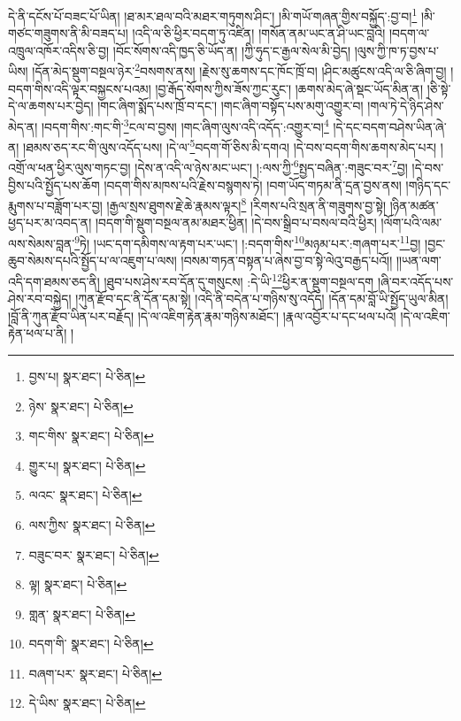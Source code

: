 དེ་ནི་དངོས་པོ་བཟང་པོ་ཡིན། །ཐ་མར་ཐལ་བའི་མཐར་གཏུགས་ཤིང་། །མི་གཡོ་གཞན་གྱིས་བསྐྱོད་:བྱ་བ།\footnote{བྱས་པ།  སྣར་ཐང་།  པེ་ཅིན། } །མི་གཙང་གཟུགས་ནི་མི་བཟད་པ། །འདི་ལ་ཅི་ཕྱིར་བདག་ཏུ་འཛིན། །གསོན་ནམ་ཡང་ན་ཤི་ཡང་བླའི། །བདག་ལ་འཁྲུལ་འཁོར་འདིས་ཅི་བྱ། །བོང་སོགས་འདི་ཁྱད་ཅི་ཡོད་ན། །ཀྱི་ཧུད་ང་རྒྱལ་སེལ་མི་བྱེད། །ལུས་ཀྱི་ཁ་ཏ་བྱས་པ་ཡིས། །དོན་མེད་སྡུག་བསྔལ་ཉེར་\footnote{ཉེས་  སྣར་ཐང་།  པེ་ཅིན། }བསགས་ནས། །རྗེས་སུ་ཆགས་དང་ཁོང་ཁྲོ་བ། །ཤིང་མཚུངས་འདི་ལ་ཅི་ཞིག་བྱ། །བདག་གིས་འདི་ལྟར་བསྐྱངས་པའམ། །བྱ་རྒོད་སོགས་ཀྱིས་ཟོས་ཀྱང་རུང་། །ཆགས་མེད་ཞེ་སྡང་ཡོད་མིན་ན། །ཅི་སྟེ་དེ་ལ་ཆགས་པར་བྱེད། །གང་ཞིག་སྨོད་པས་ཁྲོ་བ་དང་། །གང་ཞིག་བསྟོད་པས་མགུ་འགྱུར་བ། །གལ་ཏེ་དེ་ཉིད་ཤེས་མེད་ན། །བདག་གིས་:གང་གི་\footnote{གང་གིས་  སྣར་ཐང་།  པེ་ཅིན། }ངལ་བ་བྱས། །གང་ཞིག་ལུས་འདི་འདོད་:འགྱུར་བ།\footnote{གྱུར་པ།  སྣར་ཐང་།  པེ་ཅིན། } །དེ་དང་བདག་བཤེས་ཡིན་ཞེ་ན། །ཐམས་ཅད་རང་གི་ལུས་འདོད་པས། །དེ་ལ་\footnote{ལའང་  སྣར་ཐང་།  པེ་ཅིན། }བདག་གོ་ཅིས་མི་དགའ། །དེ་བས་བདག་གིས་ཆགས་མེད་པར། །འགྲོ་ལ་ཕན་ཕྱིར་ལུས་གཏང་བྱ། །དེས་ན་འདི་ལ་ཉེས་མང་ཡང་། །:ལས་ཀྱི་\footnote{ལས་ཀྱིས་  སྣར་ཐང་།  པེ་ཅིན། }སྤྱད་བཞིན་:གཟུང་བར་\footnote{བཟུང་བར་  སྣར་ཐང་།  པེ་ཅིན། }བྱ། །དེ་བས་བྱིས་པའི་སྤྱོད་པས་ཆོག །བདག་གིས་མཁས་པའི་རྗེས་བསྙགས་ཏེ། །བག་ཡོད་གཏམ་ནི་དྲན་བྱས་ནས། །གཉིད་དང་རྨུགས་པ་བཟློག་པར་བྱ། །རྒྱལ་སྲས་ཐུགས་རྗེ་ཆེ་རྣམས་ལྟར།\footnote{ལྟ།  སྣར་ཐང་།  པེ་ཅིན། } །རིགས་པའི་སྲན་ནི་གཟུགས་བྱ་སྟེ། །ཉིན་མཚན་ཕྱད་པར་མ་འབད་ན། །བདག་གི་སྡུག་བསྔལ་ནམ་མཐར་ཕྱིན། །དེ་བས་སྒྲིབ་པ་བསལ་བའི་ཕྱིར། །ལོག་པའི་ལམ་ལས་སེམས་བླན་\footnote{གླན་  སྣར་ཐང་།  པེ་ཅིན། }ཏེ། །ཡང་དག་དམིགས་ལ་རྟག་པར་ཡང་། །:བདག་གིས་\footnote{བདག་གི་  སྣར་ཐང་།  པེ་ཅིན། }མཉམ་པར་:གཞག་པར་\footnote{བཞག་པར་  སྣར་ཐང་།  པེ་ཅིན། }བྱ། །བྱང་ཆུབ་སེམས་དཔའི་སྤྱོད་པ་ལ་འཇུག་པ་ལས། །བསམ་གཏན་བསྟན་པ་ཞེས་བྱ་བ་སྟེ་ལེའུ་བརྒྱད་པའོ།། །།ཡན་ལག་འདི་དག་ཐམས་ཅད་ནི། །ཐུབ་པས་ཤེས་རབ་དོན་དུ་གསུངས། :དེ་ཡི་\footnote{དེ་ཡིས་  སྣར་ཐང་།  པེ་ཅིན། }ཕྱིར་ན་སྡུག་བསྔལ་དག །ཞི་བར་འདོད་པས་ཤེས་རབ་བསྐྱེད། །ཀུན་རྫོབ་དང་ནི་དོན་དམ་སྟེ། །འདི་ནི་བདེན་པ་གཉིས་སུ་འདོད། །དོན་དམ་བློ་ཡི་སྤྱོད་ཡུལ་མིན། །བློ་ནི་ཀུན་རྫོབ་ཡིན་པར་བརྗོད། །དེ་ལ་འཇིག་རྟེན་རྣམ་གཉིས་མཐོང་། །རྣལ་འབྱོར་པ་དང་ཕལ་པའོ། །དེ་ལ་འཇིག་རྟེན་ཕལ་པ་ནི། །
